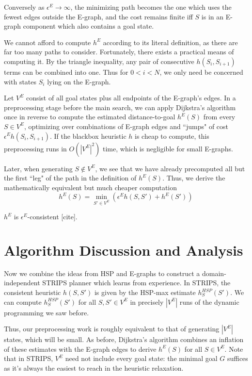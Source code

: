 \documentclass[letterpaper]{article}
\begin{document}
Conversely as $\epsilon^E \rightarrow\infty$, the minimizing path becomes the one which uses the fewest edges outside the E-graph, and the cost remains finite iff $S$ is in an E-graph component which also contains a goal state.

We cannot afford to compute $h^E$ according to its literal definition, as there are far too many paths to consider. Fortunately, there exists a practical means of computing it. By the triangle inequality, any pair of consecutive $h(S_i,S_{i+1})$ terms can be combined into one. Thus for $0 < i < N$, we only need be concerned with states $S_i$ lying on the E-graph.

Let $V^E$ consist of all goal states plus all endpoints of the E-graph's edges. In a preprocessing stage before the main search, we can apply Dijkstra's algorithm once in reverse to compute the estimated distance-to-goal $h^E(S)$ from every $S\in V^E$, optimizing over combinations of E-graph edges and ``jumps" of cost $\epsilon^E h(S_i,S_{i+1})$. If the blackbox heuristic $h$ is cheap to compute, this preprocessing runs in $O(|V^E|^2)$ time, which is negligible for small E-graphs.

Later, when generating $S \notin V^E$, we see that we have already precomputed all but the first ``leg" of the path in the definition of $h^E(S)$. Thus, we derive the mathematically equivalent but much cheaper computation
\[h^E(S) = \min_{S'\in V^E} \left(\epsilon^E h(S,S') + h^E(S')\right)\]

$h^E$ is $\epsilon^E$-consistent [cite].

\section{Algorithm Discussion and Analysis}

Now we combine the ideas from HSP and E-graphs to construct a domain-independent STRIPS planner which learns from experience. In STRIPS, the consistent heuristic $h(S,S')$ is given by the HSP-max estimate $h^{HSP}_S(S')$. We can compute $h^{HSP}_S(S')$ for all $S,S'\in V^E$ in precisely $|V^E|$ runs of the dynamic programming we saw before.

Thus, our preprocessing work is roughly equivalent to that of generating $|V^E|$ states, which will be small. As before, Dijkstra's algorithm combines an inflation of these estimates with the E-graph edges to derive $h^E(S)$ for all $S\in V^E$. Note that in STRIPS, $V^E$ need not include every goal state: the minimal goal $G$ suffices as it's always the easiest to reach in the heuristic relaxation.
\end{document}
